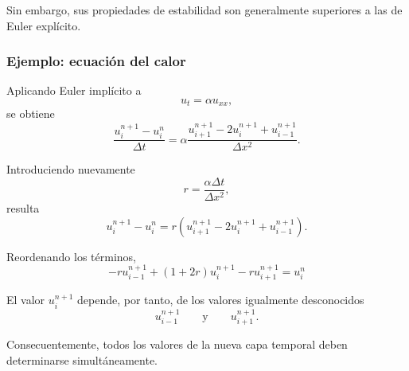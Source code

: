 \documentclass[12pt]{article}
\begin{document}
Sin embargo, sus propiedades de estabilidad son generalmente superiores a las de Euler explícito.

\subsubsection*{Ejemplo: ecuación del calor}

Aplicando Euler implícito a
\begin{equation}
    u_t=\alpha u_{xx},
\end{equation}
se obtiene
\begin{equation}
    \frac{u_i^{n+1}-u_i^n}{\Delta t}
    =
    \alpha
    \frac{
        u_{i+1}^{n+1}
        -
        2u_i^{n+1}
        +
        u_{i-1}^{n+1}
    }{\Delta x^2}.
\end{equation}

Introduciendo nuevamente
\begin{equation}
    r
    =
    \frac{\alpha\Delta t}{\Delta x^2},
\end{equation}
resulta
\begin{equation}
    u_i^{n+1}
    -
    u_i^n
    =
    r
    \left(
        u_{i+1}^{n+1}
        -
        2u_i^{n+1}
        +
        u_{i-1}^{n+1}
    \right).
\end{equation}

Reordenando los términos,
\begin{equation}
    \boxed{
    -r u_{i-1}^{n+1}
    +
    (1+2r)u_i^{n+1}
    -
    r u_{i+1}^{n+1}
    =
    u_i^n
    }
\end{equation}

El valor $u_i^{n+1}$ depende, por tanto, de los valores igualmente desconocidos
\begin{equation}
    u_{i-1}^{n+1}
    \qquad\text{y}\qquad
    u_{i+1}^{n+1}.
\end{equation}

Consecuentemente, todos los valores de la nueva capa temporal deben determinarse simultáneamente.
\end{document}

